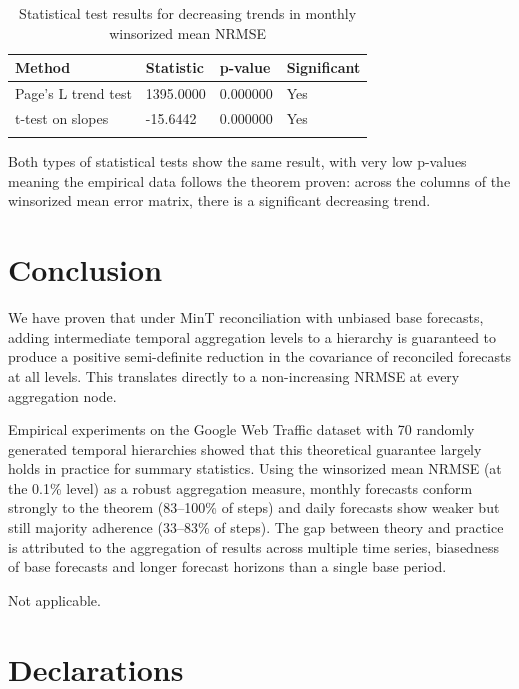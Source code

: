 \documentclass[sn-basic,Numbered,iicol]{sn-jnl}
\theoremstyle{thmstyleone}%
\theoremstyle{thmstyletwo}%
\theoremstyle{thmstylethree}%
\begin{document}
\begin{table}[h]
\caption{Statistical test results for decreasing trends in monthly winsorized mean NRMSE}\label{tab:monthly_test}
\begin{tabular}{@{}llll@{}}
\toprule
Method & Statistic & p-value & Significant \\
\midrule
Page's L trend test & 1395.0000 & 0.000000 & Yes \\
t-test on slopes & -15.6442 & 0.000000 & Yes \\
\botrule
\end{tabular}
\end{table}

Both types of statistical tests show the same result, with very low p-values meaning the empirical data follows the theorem proven: across the columns of the winsorized mean error matrix, there is a significant decreasing trend.


\section{Conclusion}\label{sec5}

We have proven that under MinT reconciliation with unbiased base forecasts, adding intermediate temporal aggregation levels to a hierarchy is guaranteed to produce a positive semi-definite reduction in the covariance of reconciled forecasts at all levels. This translates directly to a non-increasing NRMSE at every aggregation node.

Empirical experiments on the Google Web Traffic dataset with 70 randomly generated temporal hierarchies showed that this theoretical guarantee largely holds in practice for summary statistics. Using the winsorized mean NRMSE (at the 0.1\% level) as a robust aggregation measure, monthly forecasts conform strongly to the theorem (83--100\% of steps) and daily forecasts show weaker but still majority adherence (33--83\% of steps). The gap between theory and practice is attributed to the aggregation of results across multiple time series, biasedness of base forecasts and longer forecast horizons than a single base period.

\backmatter


Not applicable.

\section*{Declarations}
\end{document}
